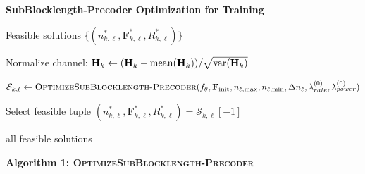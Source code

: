 \documentclass[a4paper, 12pt, onecolumn, journal, twoside, draftclsnofoot]{IEEEtran}
\begin{document}
\noindent\textbf{SubBlocklength-Precoder Optimization for Training }

\begin{algorithmic}[1]
\Ensure
Feasible solutions
$\{(n_{k,\ell}^*, \mathbf{F}_{k,\ell}^*, R_{k,\ell}^*)\}$

 

    \State Normalize channel:
    ${\bf H}_k \gets ({\bf H}_k - \mathrm{mean}({\bf H}_k)) / \sqrt{\mathrm{var}({\bf H}_k)}$

     
	

        \State
        $\mathcal{S}_{k,\ell}
        \gets
        \textsc{OptimizeSubBlocklength-Precoder}
        (f_\theta,
        \mathbf{F}_{\mathrm{init}},
        n_{\ell,\max},
        n_{\ell,\min},
        \Delta n_\ell,
        \lambda_{rate}^{(0)},
        \lambda_{power}^{(0)})$

        \State Select feasible tuple
        $(n_{k,\ell}^*, \mathbf{F}_{k,\ell}^*, R_{k,\ell}^*)
        = \mathcal{S}_{k,\ell}[-1]$

    \EndFor
\EndFor

\State \Return all feasible solutions
\end{algorithmic}


\newpage


\noindent\textbf{Algorithm 1: \textsc{OptimizeSubBlocklength-Precoder}}
\end{document}
